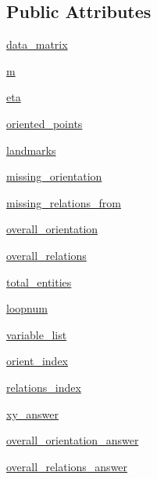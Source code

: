\subsection*{Public Attributes}
\begin{DoxyCompactItemize}
\item 
\hyperlink{classstarvars_1_1StarVars_a0deb0b64b74ef8f10a7941f042741db4}{data\-\_\-matrix}
\item 
\hyperlink{classstarvars_1_1StarVars_acb182bf64bd4d1786654881f758a3285}{m}
\item 
\hyperlink{classstarvars_1_1StarVars_a6ea108f66bbd8f5744dc15dac70905a7}{eta}
\item 
\hyperlink{classstarvars_1_1StarVars_a7dcf860cb0c4d7cd67a0e4078656a286}{oriented\-\_\-points}
\item 
\hyperlink{classstarvars_1_1StarVars_a8e56638a942f24a9929b50ad895db412}{landmarks}
\item 
\hyperlink{classstarvars_1_1StarVars_a1e0d57adb59ce8bb33bd892d96c9b2f6}{missing\-\_\-orientation}
\item 
\hyperlink{classstarvars_1_1StarVars_ad5acc05763dcb07361ad63adb12ea80c}{missing\-\_\-relations\-\_\-from}
\item 
\hyperlink{classstarvars_1_1StarVars_a151e74e8625e7887bc53a6436e09a958}{overall\-\_\-orientation}
\item 
\hyperlink{classstarvars_1_1StarVars_ad332c549295c22b5b86e820253a7125a}{overall\-\_\-relations}
\item 
\hyperlink{classstarvars_1_1StarVars_ae422b5451a6755af3cbd275608756ed1}{total\-\_\-entities}
\item 
\hyperlink{classstarvars_1_1StarVars_ac65a61b0589e992831bc31185ca1cae7}{loopnum}
\item 
\hyperlink{classstarvars_1_1StarVars_a49126602e2b9e3b37bf3935ec387997c}{variable\-\_\-list}
\item 
\hyperlink{classstarvars_1_1StarVars_a5ef4b1343fefb0ec498a456b12d741e1}{orient\-\_\-index}
\item 
\hyperlink{classstarvars_1_1StarVars_a228e7e86033c3b18aa6713a71cb17077}{relations\-\_\-index}
\item 
\hyperlink{classstarvars_1_1StarVars_ac079b3194d890372bc64d1d6feb76874}{xy\-\_\-answer}
\item 
\hyperlink{classstarvars_1_1StarVars_a33ced1c7a9724fe809f86dd06251f023}{overall\-\_\-orientation\-\_\-answer}
\item 
\hyperlink{classstarvars_1_1StarVars_a36974111eb721cc769fb513cfe1db089}{overall\-\_\-relations\-\_\-answer}
\end{DoxyCompactItemize}


